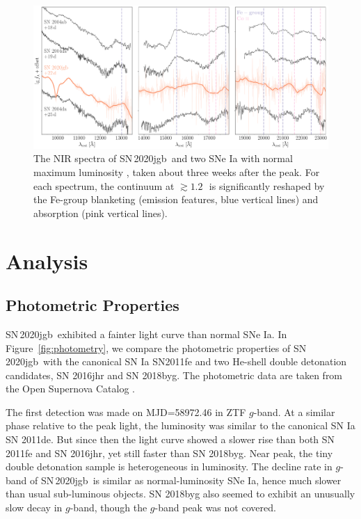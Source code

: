 \documentclass[twocolumn]{aastex631}
\newcommand\sn{SN\,2020jgb}
\begin{document}
\begin{figure}
    \centering
    \includegraphics[width=\textwidth]{NIR_spec.pdf}
    \caption{The NIR spectra of \sn\ and two SNe Ia with normal maximum luminosity \citep[SN 2004ab and SN 2004da,][]{Marion2009_NIR}, taken about three weeks after the peak. For each spectrum, the continuum at $\gtrsim1.2$\,\micron\  is significantly reshaped by the Fe-group blanketing (emission features, blue vertical lines) and  absorption (pink vertical lines).}
    \label{fig:NIR_spec}
\end{figure}

\section{Analysis} \label{sec:analysis}
\subsection{Photometric Properties}
\sn\ exhibited a fainter light curve than normal SNe Ia. In Figure~\ref{fig:photometry}, we compare the photometric properties of \sn\ with the canonical SN Ia SN2011fe \citep{Nugent_11fe_2011} and two He-shell double detonation candidates, SN 2016jhr and SN 2018byg. The photometric data are taken from the Open Supernova Catalog \citep{Guillochon_2017}.

The first detection was made on MJD=58972.46 in ZTF $g$-band. At a similar phase relative to the peak light, the luminosity was similar to the canonical SN Ia SN 2011de. But since then the light curve showed a slower rise than both SN 2011fe and SN 2016jhr, yet still faster than SN 2018byg. Near peak, the tiny double detonation sample is heterogeneous in luminosity. The decline rate in $g$-band of \sn\ is similar as normal-luminosity SNe Ia, hence much slower than usual sub-luminous objects. SN 2018byg also seemed to exhibit an unusually slow decay in $g$-band, though the $g$-band peak was not covered.
\end{document}

